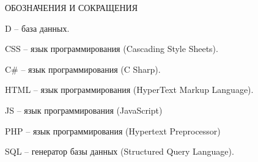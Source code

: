 \newpage
\begin{center}ОБОЗНАЧЕНИЯ И СОКРАЩЕНИЯ\end{center}


D – база данных.

CSS – язык программирования (Cascading Style Sheets).

C\# – язык программирования (C Sharp).

HTML – язык программирования (HyperText Markup Language).

JS – язык программирования (JavaScript)

PHP – язык программирования (Hypertext Preprocessor)

SQL – генератор базы данных (Structured Query Language).



